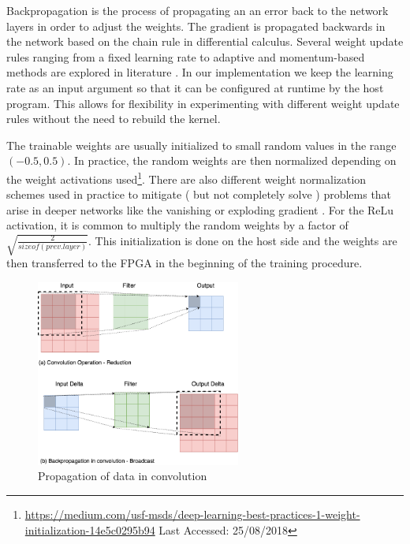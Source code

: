 Backpropagation is the process of propagating an an error back to the network layers in order to adjust the weights. The gradient is propagated backwards in the network based on the chain rule in differential calculus. Several weight update rules ranging from a fixed learning rate to adaptive and momentum-based methods are explored in literature \cite{ddl}. In our implementation we keep the learning rate as an input argument so that it can be configured at runtime by the host program. This allows for flexibility in experimenting with different weight update rules without the need to rebuild the kernel.

The trainable weights are usually initialized to small random values in the range $ (-0.5,0.5) $. In practice, the random weights are then normalized depending on the weight activations used\footnote{\url{https://medium.com/usf-msds/deep-learning-best-practices-1-weight-initialization-14e5c0295b94} Last Accessed: 25/08/2018}. There are also different weight normalization schemes used in practice to mitigate ( but not completely solve ) problems that arise in deeper networks like the vanishing or exploding gradient \cite{hochreiter1998vanishing}. For the ReLu activation, it is common to multiply the random weights by a factor of $ \sqrt{\frac{2}{sizeof(prev. layer)}} $. This initialization is done on the host side and the weights are then transferred to the FPGA in the beginning of the training procedure. 


\begin{figure}[h]
\centering
\includegraphics[width=0.6\textwidth]{Figures/convprop}
\caption[Propagation of data in convolution]{ Propagation of data in convolution }
\decoRule
\label{fig:conv}
\end{figure}

